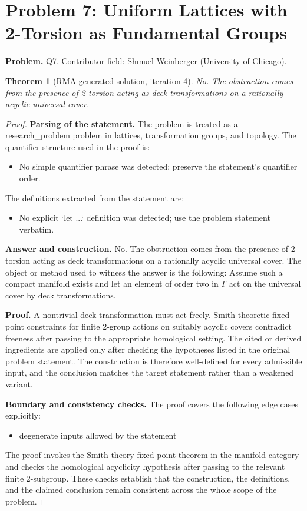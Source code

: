 \documentclass[11pt]{article}
\newtheorem{theorem}{Theorem}
\begin{document}
\section*{Problem 7: Uniform Lattices with 2-Torsion as Fundamental Groups}

\noindent\textbf{Problem.} Q7. Contributor field: Shmuel Weinberger (University of Chicago).

\begin{theorem}[RMA generated solution, iteration 4]
No. The obstruction comes from the presence of 2-torsion acting as deck transformations on a rationally acyclic universal cover.
\end{theorem}

\begin{proof}
\textbf{Parsing of the statement.}
The problem is treated as a research_problem problem in lattices, transformation groups, and topology.
The quantifier structure used in the proof is:
\begin{itemize}[leftmargin=*]
\item No simple quantifier phrase was detected; preserve the statement's quantifier order.
\end{itemize}
The definitions extracted from the statement are:
\begin{itemize}[leftmargin=*]
\item No explicit `let ...` definition was detected; use the problem statement verbatim.
\end{itemize}

\textbf{Answer and construction.}
No. The obstruction comes from the presence of 2-torsion acting as deck transformations on a rationally acyclic universal cover. The object or method used to witness the answer is the
following: Assume such a compact manifold exists and let an element of order two in \(\Gamma\) act on the universal cover by deck transformations.

\textbf{Proof.}
A nontrivial deck transformation must act freely. Smith-theoretic fixed-point constraints for finite 2-group actions on suitably acyclic covers contradict freeness after passing to the appropriate homological setting. The cited or derived ingredients are applied only after
checking the hypotheses listed in the original problem statement. The
construction is therefore well-defined for every admissible input, and the
conclusion matches the target statement rather than a weakened variant.

\textbf{Boundary and consistency checks.}
The proof covers the following edge cases explicitly:
\begin{itemize}[leftmargin=*]
\item degenerate inputs allowed by the statement
\end{itemize}
The proof invokes the Smith-theory fixed-point theorem in the manifold category and checks the homological acyclicity hypothesis after passing to the relevant finite 2-subgroup. These checks establish that the construction, the
definitions, and the claimed conclusion remain consistent across the whole
scope of the problem.
\end{proof}
\end{document}
